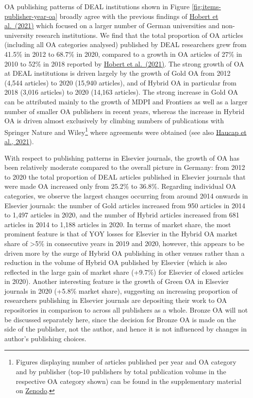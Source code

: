 \documentclass[
]{article}
\begin{document}
OA publishing patterns of DEAL institutions shown in Figure \ref{fig:items-publisher-year-oa} broadly agree with the previous findings of \href{https://doi.org/10.1007/s11192-021-04002-0}{Hobert et al.~(2021)} which focused on a larger number of German universities and non-university research institutions. We find that the total proportion of OA articles (including all OA categories analysed) published by DEAL researchers grew from 41.5\% in 2012 to 68.7\% in 2020, compared to a growth in OA articles of 27\% in 2010 to 52\% in 2018 reported by \href{https://doi.org/10.1007/s11192-021-04002-0}{Hobert et al.~(2021)}. The strong growth of OA at DEAL institutions is driven largely by the growth of Gold OA from 2012 (4,544 articles) to 2020 (15,940 articles), and of Hybrid OA in particular from 2018 (3,016 articles) to 2020 (14,163 articles). The strong increase in Gold OA can be attributed mainly to the growth of MDPI and Frontiers as well as a larger number of smaller OA publishers in recent years, whereas the increase in Hybrid OA is driven almost exclusively by climbing numbers of publications with Springer Nature and Wiley\footnote{Figures displaying number of articles published per year and OA category and by publisher (top-10 publishers by total publication volume in the respective OA category shown) can be found in the supplementary material on \href{https://doi.org/10.5281/zenodo.4771576}{Zenodo}.} where agreements were obtained (see also \href{https://www.cesifo.org/en/publikationen/2021/working-paper/impact-german-deal-competition-academic-publishing-market}{Haucap et al., 2021}).

With respect to publishing patterns in Elsevier journals, the growth of OA has been relatively moderate compared to the overall picture in Germany: from 2012 to 2020 the total proportion of DEAL articles published in Elsevier journals that were made OA increased only from 25.2\% to 36.8\%. Regarding individual OA categories, we observe the largest changes occurring from around 2014 onwards in Elsevier journals: the number of Gold articles increased from 950 articles in 2014 to 1,497 articles in 2020, and the number of Hybrid articles increased from 681 articles in 2014 to 1,188 articles in 2020. In terms of market share, the most prominent feature is that of YOY losses for Elsevier in the Hybrid OA market share of \textgreater5\% in consecutive years in 2019 and 2020, however, this appears to be driven more by the surge of Hybrid OA publishing in other venues rather than a reduction in the volume of Hybrid OA published by Elsevier (which is also reflected in the large gain of market share (+9.7\%) for Elsevier of closed articles in 2020). Another interesting feature is the growth of Green OA in Elsevier journals in 2020 (+5.8\% market share), suggesting an increasing proportion of researchers publishing in Elsevier journals are depositing their work to OA repositories in comparison to across all publishers as a whole. Bronze OA will not be discussed separately here, since the decision for Bronze OA is made on the side of the publisher, not the author, and hence it is not influenced by changes in author's publishing choices.
\end{document}
